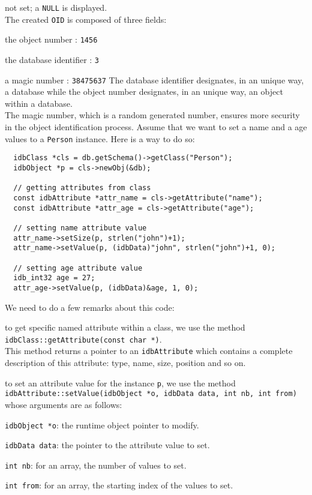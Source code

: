 not set; a \texttt{NULL} is displayed.
\\
The created \texttt{OID} is composed of three fields:
\be
\item the object number : \texttt{1456}
\item the database identifier : \texttt{3}
\item a magic number : \texttt{38475637}
\ee
The database identifier designates, in an unique way, a database while
the object number designates, in an unique way, an object within a database.
\\
The magic number, which is a random generated number, ensures more security
in the object identification process.
Assume that we want to set a name and a age values to a \texttt{Person} instance.
Here is a way to do so:
\verbsize
\begin{verbatim}
  idbClass *cls = db.getSchema()->getClass("Person");
  idbObject *p = cls->newObj(&db);

  // getting attributes from class
  const idbAttribute *attr_name = cls->getAttribute("name");
  const idbAttribute *attr_age = cls->getAttribute("age");

  // setting name attribute value
  attr_name->setSize(p, strlen("john")+1);
  attr_name->setValue(p, (idbData)"john", strlen("john")+1, 0);

  // setting age attribute value
  idb_int32 age = 27;
  attr_age->setValue(p, (idbData)&age, 1, 0);
\end{verbatim}
\normalsize
We need to do a few remarks about this code:
\be
\item to get specific named attribute within a class,
we use the method \texttt{idbClass::getAttribute(const char *)}.
\\
This method returns a pointer to an \texttt{idbAttribute} which contains
a complete description of this attribute: type, name, size, position and
so on.
\item to set an attribute value for the instance \texttt{p}, we
use the method \texttt{idbAttribute::setValue(idbObject *o, idbData data,
int nb, int from)} whose arguments are as follows:
\be
\item \texttt{idbObject *o}: the runtime object pointer to modify.
\item \texttt{idbData data}: the pointer to the attribute value to set.
\item \texttt{int nb}: for an array, the number of values to set.
\item \texttt{int from}: for an array, the starting index of the values to set.
